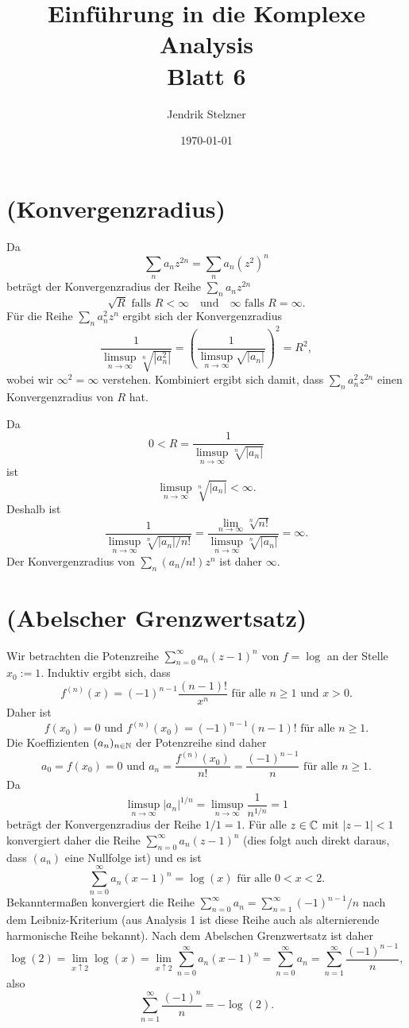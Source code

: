 \documentclass[a4paper,10pt]{article}
\title{\sc Einführung in die Komplexe Analysis \\ \Large Blatt 6}
\author{Jendrik Stelzner}
\date{\today}
\begin{document}
\maketitle





\section{(Konvergenzradius)}
Da
\[
 \sum_n a_n z^{2n}
 = \sum_n a_n \left(z^2\right)^n
\]
beträgt der Konvergenzradius der Reihe $\sum_n a_n z^{2n}$
\[
 \sqrt{R} \text{ falls } R < \infty \quad \text{und} \quad \infty \text{ falls } R = \infty.
\]
Für die Reihe $\sum_n a_n^2 z^n$ ergibt sich der Konvergenzradius
\[
 \frac{1}{\limsup_{n \to \infty} \sqrt[n]{|a_n^2|}}
 = \left( \frac{1}{\limsup_{n \to \infty} \sqrt{|a_n|}} \right)^2
 = R^2,
\]
wobei wir $\infty^2 = \infty$ verstehen. Kombiniert ergibt sich damit, dass $\sum_n a_n^2 z^{2n}$ einen Konvergenzradius von $R$ hat.

Da
\[
 0 < R = \frac{1}{\limsup_{n \to \infty} \sqrt[n]{|a_n|}}
\]
ist
\[
 \limsup_{n \to \infty} \sqrt[n]{|a_n|} < \infty.
\]
Deshalb ist
\[
 \frac{1}{\limsup_{n \to \infty} \sqrt[n]{|a_n|/n!}}
 = \frac{\lim_{n \to \infty} \sqrt[n]{n!}}{\limsup_{n \to \infty} \sqrt[n]{|a_n|}}
 = \infty.
\]
Der Konvergenzradius von $\sum_n (a_n/n!) z^n$ ist daher $\infty$.





\section{(Abelscher Grenzwertsatz)}
Wir betrachten die Potenzreihe $\sum_{n=0}^\infty a_n (z-1)^n$ von $f = \log$ an der Stelle $x_0 := 1$. Induktiv ergibt sich, dass
\[
 f^{(n)}(x) = (-1)^{n-1} \frac{(n-1)!}{x^n} \text{ für alle } n \geq 1 \text{ und } x > 0.
\]
Daher ist
\[
 f(x_0) = 0 \text{ und } f^{(n)}(x_0) = (-1)^{n-1}(n-1)! \text{ für alle } n \geq 1.
\]
Die Koeffizienten $(a_n)_{n \in \mathbb{N}}$ der Potenzreihe sind daher
\[
 a_0 = f(x_0) = 0 \text{ und } a_n = \frac{f^{(n)}(x_0)}{n!} = \frac{(-1)^{n-1}}{n} \text{ für alle } n \geq 1.
\]
Da
\[
 \limsup_{n \to \infty} |a_n|^{1/n} = \limsup_{n \to \infty} \frac{1}{n^{1/n}} = 1
\]
beträgt der Konvergenzradius der Reihe $1/1 = 1$. Für alle $z \in \mathbb{C}$ mit $|z-1| < 1$ konvergiert daher die Reihe $\sum_{n=0}^\infty a_n (z-1)^n$ (dies folgt auch direkt daraus, dass $(a_n)$ eine Nullfolge ist) und es ist
\[
 \sum_{n=0}^\infty a_n (x-1)^n = \log(x) \text{ für alle } 0 < x < 2.
\]
Bekanntermaßen konvergiert die Reihe $\sum_{n=0}^\infty a_n = \sum_{n=1}^\infty (-1)^{n-1}/n$ nach dem Leibniz-Kriterium (aus Analysis 1 ist diese Reihe auch als alternierende harmonische Reihe bekannt). Nach dem Abelschen Grenzwertsatz ist daher
\[
 \log(2)
 = \lim_{x \uparrow 2} \log(x)
 = \lim_{x \uparrow 2} \sum_{n=0}^\infty a_n (x-1)^n
 = \sum_{n=0}^\infty a_n
 = \sum_{n=1}^\infty \frac{(-1)^{n-1}}{n},
\]
also
\[
 \sum_{n=1}^\infty \frac{(-1)^n}{n} = -\log(2).
\]
\end{document}
